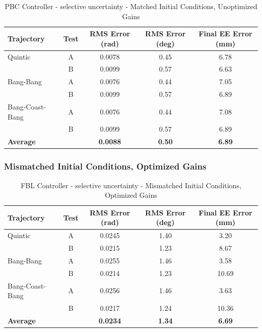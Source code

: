 \documentclass[11pt,a4paper]{article}
\begin{document}
\begin{table}[H]
\centering
\caption{PBC Controller - selective uncertainty - Matched Initial Conditions, Unoptimized Gains}
\begin{tabular}{lcccc}
\toprule
Trajectory & Test & RMS Error (rad) & RMS Error (deg) & Final EE Error (mm) \\
\midrule
Quintic & A & 0.0078 & 0.45 & 6.78 \\
 & B & 0.0099 & 0.57 & 6.63 \\
\midrule
Bang-Bang & A & 0.0076 & 0.44 & 7.05 \\
 & B & 0.0099 & 0.57 & 6.89 \\
\midrule
Bang-Coast-Bang & A & 0.0076 & 0.44 & 7.08 \\
 & B & 0.0099 & 0.57 & 6.89 \\
\midrule
\textbf{Average} & & \textbf{0.0088} & \textbf{0.50} & \textbf{6.89} \\
\bottomrule
\end{tabular}
\end{table}

\subsubsection{Mismatched Initial Conditions, Optimized Gains}

\begin{table}[H]
\centering
\caption{FBL Controller - selective uncertainty - Mismatched Initial Conditions, Optimized Gains}
\begin{tabular}{lcccc}
\toprule
Trajectory & Test & RMS Error (rad) & RMS Error (deg) & Final EE Error (mm) \\
\midrule
Quintic & A & 0.0245 & 1.40 & 3.20 \\
 & B & 0.0215 & 1.23 & 8.67 \\
\midrule
Bang-Bang & A & 0.0255 & 1.46 & 3.58 \\
 & B & 0.0214 & 1.23 & 10.69 \\
\midrule
Bang-Coast-Bang & A & 0.0256 & 1.46 & 3.63 \\
 & B & 0.0217 & 1.24 & 10.36 \\
\midrule
\textbf{Average} & & \textbf{0.0234} & \textbf{1.34} & \textbf{6.69} \\
\bottomrule
\end{tabular}
\end{table}
\end{document}
